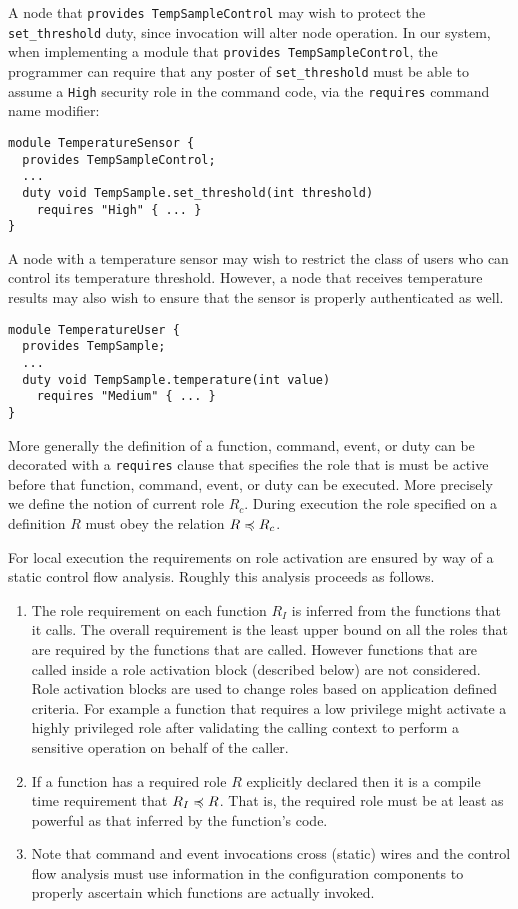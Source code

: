 A node that \texttt{provides TempSampleControl} may wish to protect the \texttt{set\_threshold}
duty, since invocation will alter node operation. In our system, when implementing a module that
\texttt{provides TempSampleControl}, the programmer can require that any poster of
\texttt{set\_threshold} must be able to assume a \texttt{High} security role in the command
code, via the \texttt{requires} command name modifier:
\begin{verbatim}
module TemperatureSensor { 
  provides TempSampleControl;
  ...
  duty void TempSample.set_threshold(int threshold)
    requires "High" { ... }
}
\end{verbatim}

A node with a temperature sensor may wish to restrict the class of users who can control its
temperature threshold. However, a node that receives temperature results may also wish to ensure
that the sensor is properly authenticated as well.
\begin{verbatim}
module TemperatureUser {
  provides TempSample;
  ...
  duty void TempSample.temperature(int value)
    requires "Medium" { ... }
}
\end{verbatim}

More generally the definition of a function, command, event, or duty can be decorated with a
\texttt{requires} clause that specifies the role that is must be active before that function,
command, event, or duty can be executed. More precisely we define the notion of current role
$R_c$. During execution the role specified on a definition $R$ must obey the relation $R \preccurlyeq
R_c$.

For local execution the requirements on role activation are ensured by way of a static control
flow analysis. Roughly this analysis proceeds as follows.
\begin{enumerate}
\item The role requirement on each function $R_I$ is inferred from the functions that it calls.
  The overall requirement is the least upper bound on all the roles that are required by the
  functions that are called. However functions that are called inside a role activation block
  (described below) are not considered. Role activation blocks are used to change roles based on
  application defined criteria. For example a function that requires a low privilege might
  activate a highly privileged role after validating the calling context to perform a sensitive
  operation on behalf of the caller.
\item If a function has a required role $R$ explicitly declared then it is a compile time
  requirement that $R_I \preccurlyeq R$. That is, the required role must be at least as powerful as that
  inferred by the function's code.
\item Note that command and event invocations cross (static) wires and the control flow analysis
  must use information in the configuration components to properly ascertain which functions are
  actually invoked.
\end{enumerate}

